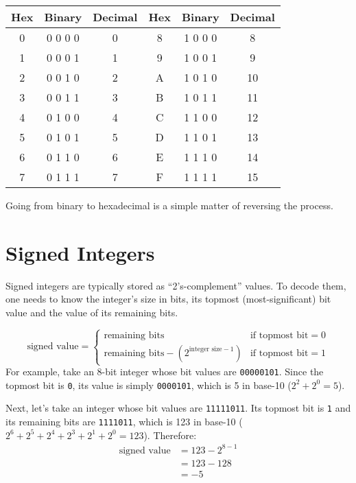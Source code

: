 
\begin{tabular}{| c | c | c || c | c | c |}
\hline
Hex & Binary & Decimal & Hex & Binary & Decimal \\
\hline
0 & 0 0 0 0 & 0 & 8 & 1 0 0 0 & 8 \\
1 & 0 0 0 1 & 1 & 9 & 1 0 0 1 & 9 \\
2 & 0 0 1 0 & 2 & A & 1 0 1 0 & 10 \\
3 & 0 0 1 1 & 3 & B & 1 0 1 1 & 11 \\
4 & 0 1 0 0 & 4 & C & 1 1 0 0 & 12 \\
5 & 0 1 0 1 & 5 & D & 1 1 0 1 & 13 \\
6 & 0 1 1 0 & 6 & E & 1 1 1 0 & 14 \\
7 & 0 1 1 1 & 7 & F & 1 1 1 1 & 15 \\
\hline
\end{tabular}
\begin{flushleft}
Going from binary to hexadecimal is a simple matter of reversing
the process.
\end{flushleft}

\section{Signed Integers}
Signed integers are typically stored as ``2's-complement'' values.
To decode them, one needs to know the integer's size in bits, its
topmost (most-significant) bit value and the value of its remaining bits.

\begin{equation}
\text{signed value} =
\begin{cases}
\text{remaining bits} & \text{if topmost bit} = 0 \\
\text{remaining bits} - (2 ^ {\text{integer size} - 1}) & \text{if topmost bit} = 1
\end{cases}
\end{equation}
For example, take an 8-bit integer whose bit values are \texttt{00000101}.
Since the topmost bit is \texttt{0}, its value is simply \texttt{0000101},
which is 5 in base-10 ($2 ^ 2 + 2 ^ 0 = 5$).

Next, let's take an integer whose bit values are \texttt{11111011}.
Its topmost bit is \texttt{1} and its remaining bits are \texttt{1111011},
which is 123 in base-10
($2 ^ 6 + 2 ^ 5 + 2 ^ 4 + 2 ^ 3 + 2 ^ 1 + 2 ^ 0 = 123$).
Therefore:
\begin{align*}
\text{signed value} &= 123 - 2 ^ {8 - 1} \\
 &= 123 - 128 \\
 &= -5
\end{align*}

